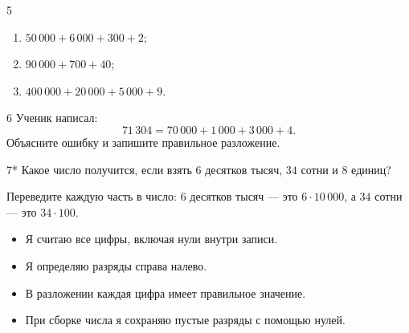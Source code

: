 \begin{homeworktask}{5}
  \begin{enumerate}
    \item \(50\,000+6\,000+300+2\);
    \item \(90\,000+700+40\);
    \item \(400\,000+20\,000+5\,000+9\).
  \end{enumerate}
  \answerspace{30mm}
\end{homeworktask}

\begin{homeworktask}{6}
  Ученик написал:
  \[
    71\,304=70\,000+1\,000+3\,000+4.
  \]
  Объясните ошибку и запишите правильное разложение.
  \answerspace{36mm}
\end{homeworktask}

\begin{homeworktask}{7*}
  Какое число получится, если взять \(6\) десятков тысяч, \(34\) сотни
  и \(8\) единиц?

  \begin{hintbox}
    Переведите каждую часть в число:
    \(6\) десятков тысяч --- это \(6\cdot10\,000\),
    а \(34\) сотни --- это \(34\cdot100\).
  \end{hintbox}
  \answerspace{42mm}
\end{homeworktask}

\begin{selfcheck}
  \begin{itemize}[label=\(\square\),leftmargin=1.7em,itemsep=0.25em,topsep=0.2em]
    \item Я считаю все цифры, включая нули внутри записи.
    \item Я определяю разряды справа налево.
    \item В разложении каждая цифра имеет правильное значение.
    \item При сборке числа я сохраняю пустые разряды с помощью нулей.
  \end{itemize}
\end{selfcheck}
